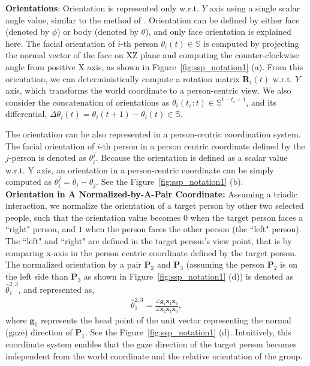 \noindent \textbf{Orientations}: Orientation is represented only w.r.t. $Y$ axis using a single scalar angle value, similar to the method of \cite{mnih2012conditional, Fragkiadaki_2015_ICCV}. Orientation can be defined by either face (denoted by $\phi$) or body (denoted by $\theta$), and only face orientation is explained here. The facial orientation of $i$-th person $\theta_i(t) \in \mathbb{S}$ is computed by projecting the normal vector of the face on XZ plane and computing the counter-clockwise angle from positive X axis, as shown in Figure~\ref{fig:ssp_notation1} (a). From this orientation, we can deterministically compute a rotation matrix $\mathbf{R}_i(t)$ w.r.t. $Y$ axis, which transforms the world coordinate to a person-centric view. We also consider the concatenation of orientations as $\theta_i(t_s:t) \in \mathbb{S}^{t- t_s + 1}$, and its differential, $\Delta \theta_i(t) = \theta_i(t+1) - \theta_i(t) \in \mathbb{S}$.

The orientation can be also represented in a person-centric coordination system. The facial orientation of $i$-th person in a person centric coordinate defined by the $j$-person is denoted as $\theta_i^j$. Because the orientation is defined as a scalar value w.r.t. Y axis, an orientation in a person-centric coordinate can be simply computed as $\theta_i^j = \theta_i - \theta_j$. See the Figure~\ref{fig:ssp_notation1} (b).\\

\noindent \textbf{Orientation in A Normalized-by-A-Pair Coordinate:} Assuming a triadic interaction, we normalize the orientation of a target person by other two selected people, such that the orientation value becomes $0$ when the target person faces a ``right" person, and $1$ when the person faces the other person (the ``left" person). The ``left" and ``right" are defined in the target person's view point, that is by comparing x-axis in the person centric coordinate defined by the target person. The normalized orientation by a pair $\mathbf{P}_2$ and $\mathbf{P}_3$  (assuming the person $\mathbf{P}_2$ is on the left side than $\mathbf{P}_3$ as shown in Figure~\ref{fig:ssp_notation1} (d)) is denoted as $\hat{\theta}_1^{2,3}$, and represented as, 
\begin{align}
\hat{\theta}_1^{2,3} = \frac{\angle \mathbf{g}_1\mathbf{x}_1\mathbf{x}_3}{\angle \mathbf{x}_2\mathbf{x}_1\mathbf{x}_3},
\end{align}
where $\mathbf{g}_1$ represents the head point of the unit vector representing the normal (gaze) direction of $\mathbf{P}_1$. See the Figure~\ref{fig:ssp_notation1} (d). Intuitively, this coordinate system enables that the gaze direction of the target person becomes independent from the world coordinate and the relative orientation of the group.   \\


